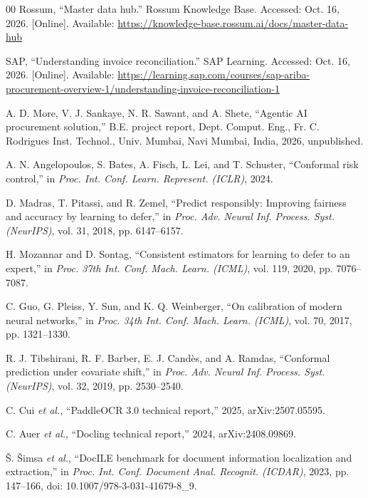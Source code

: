 \documentclass[conference]{IEEEtran}
\newif\ifanon
\begin{document}
\begin{thebibliography}{00}
Rossum, ``Master data hub.'' Rossum Knowledge Base. Accessed: Oct. 16, 2026.
[Online]. Available: \url{https://knowledge-base.rossum.ai/docs/master-data-hub}

SAP, ``Understanding invoice reconciliation.'' SAP Learning. Accessed: Oct. 16,
2026. [Online]. Available:
\url{https://learning.sap.com/courses/sap-ariba-procurement-overview-1/understanding-invoice-reconciliation-1}

\ifanon
[Anonymized for review].
\else
A. D. More, V. J. Sankaye, N. R. Sawant, and A. Shete, ``Agentic AI procurement
solution,'' B.E. project report, Dept. Comput. Eng., Fr. C. Rodrigues Inst.
Technol., Univ. Mumbai, Navi Mumbai, India, 2026, unpublished.
\fi

A. N. Angelopoulos, S. Bates, A. Fisch, L. Lei, and T. Schuster, ``Conformal risk
control,'' in \emph{Proc. Int. Conf. Learn. Represent. (ICLR)}, 2024.

D. Madras, T. Pitassi, and R. Zemel, ``Predict responsibly: Improving fairness
and accuracy by learning to defer,'' in \emph{Proc. Adv. Neural Inf. Process.
Syst. (NeurIPS)}, vol. 31, 2018, pp. 6147--6157.

H. Mozannar and D. Sontag, ``Consistent estimators for learning to defer to an
expert,'' in \emph{Proc. 37th Int. Conf. Mach. Learn. (ICML)}, vol. 119, 2020,
pp. 7076--7087.

C. Guo, G. Pleiss, Y. Sun, and K. Q. Weinberger, ``On calibration of modern
neural networks,'' in \emph{Proc. 34th Int. Conf. Mach. Learn. (ICML)}, vol. 70,
2017, pp. 1321--1330.

R. J. Tibshirani, R. F. Barber, E. J. Cand\`es, and A. Ramdas, ``Conformal
prediction under covariate shift,'' in \emph{Proc. Adv. Neural Inf. Process.
Syst. (NeurIPS)}, vol. 32, 2019, pp. 2530--2540.

C. Cui \emph{et al.}, ``PaddleOCR 3.0 technical report,'' 2025,
arXiv:2507.05595.

C. Auer \emph{et al.}, ``Docling technical report,'' 2024, arXiv:2408.09869.

\v{S}. \v{S}imsa \emph{et al.}, ``DocILE benchmark for document information
localization and extraction,'' in \emph{Proc. Int. Conf. Document Anal. Recognit.
(ICDAR)}, 2023, pp. 147--166, doi: 10.1007/978-3-031-41679-8\_9.


\end{thebibliography}
\end{document}
